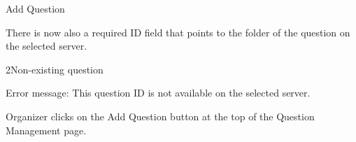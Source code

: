 
\begin{uc}{Add Question}


    There is now also a required ID field that points to the folder of the question on the
    selected server.

    \begin{uc-ext}

        \begin{uc-fail}{2}{Non-existing question}
        \item Error message: This question ID is not available on the selected server.
        \end{uc-fail}

    \end{uc-ext}

    \begin{uc-trig}
        Organizer clicks on the Add Question button at the top of the Question Management
        page.
    \end{uc-trig}

\end{uc}

